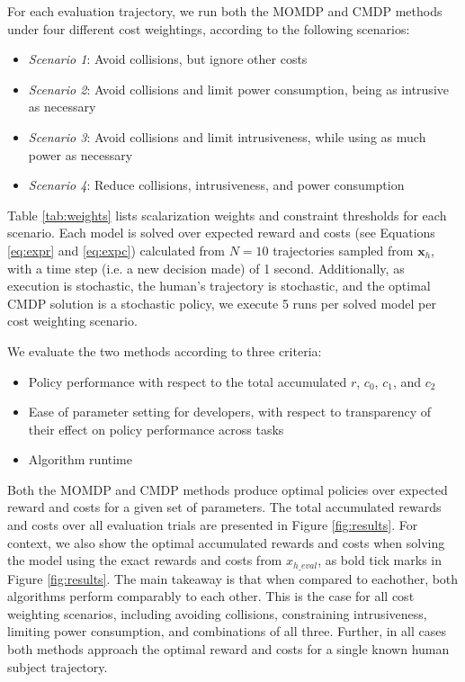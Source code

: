 \documentclass[letterpaper, 10 pt, conference]{ieeeconf}  %
\begin{document}
For each evaluation trajectory, we run both the MOMDP and CMDP methods under four different cost weightings, according to the following scenarios:
\begin{itemize}
  \item \textit{Scenario 1}: Avoid collisions, but ignore other costs
  \item \textit{Scenario 2}: Avoid collisions and limit power consumption, being as intrusive as necessary
  \item \textit{Scenario 3}: Avoid collisions and limit intrusiveness, while using as much power as necessary
  \item \textit{Scenario 4}: Reduce collisions, intrusiveness, and power consumption
\end{itemize}
Table \ref{tab:weights} lists scalarization weights and constraint thresholds for each scenario.  Each model is solved over expected reward and costs (see Equations \ref{eq:expr} and \ref{eq:expc}) calculated from $N=10$ trajectories sampled from $\mathbf{x}_h$, with a time step (i.e. a new decision made) of 1 second.  Additionally, as execution is stochastic, the human's trajectory is stochastic, and the optimal CMDP solution is a stochastic policy, we execute 5 runs per solved model per cost weighting scenario.

We evaluate the two methods according to three criteria:
\begin{itemize}
  \item Policy performance with respect to the total accumulated $r$, $c_0$, $c_1$, and $c_2$
  \item Ease of parameter setting for developers, with respect to transparency of their effect on policy performance across tasks
  \item Algorithm runtime
\end{itemize}
Both the MOMDP and CMDP methods produce optimal policies over expected reward and costs for a given set of parameters.  The total accumulated rewards and costs over all evaluation trials are presented in Figure \ref{fig:results}.  For context, we also show the optimal accumulated rewards and costs when solving the model using the exact rewards and costs from $x_{h\_eval}$, as bold tick marks in Figure \ref{fig:results}.  The main takeaway is that when compared to eachother, both algorithms perform comparably to each other.  This is the case for all cost weighting scenarios, including avoiding collisions, constraining intrusiveness, limiting power consumption, and combinations of all three.  Further, in all cases both methods approach the optimal reward and costs for a single known human subject trajectory.
\end{document}
